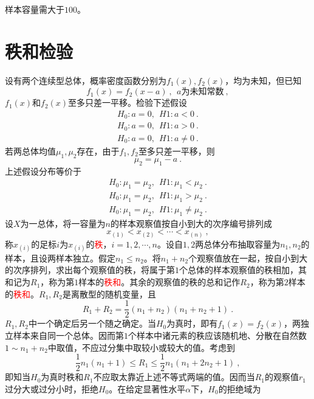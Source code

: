 \documentclass[12pt,a4paper]{article}
\begin{document}
样本容量需大于$100$。


\section{秩和检验}
设有两个连续型总体，概率密度函数分别为$f_1(x), f_2(x)$，均为未知，但已知
\begin{equation}
f_1(x) = f_2(x-a) ~, ~~a\text{为未知常数} ~, 
\end{equation}
$f_1(x)$和$f_2(x)$至多只差一平移。检验下述假设
\begin{eqnarray}
H_0 : a = 0, ~~H1 : a < 0 ~. \\
H_0 : a = 0, ~~H1 : a > 0 ~. \\
H_0 : a = 0, ~~H1 : a \neq 0 ~.
\end{eqnarray}
若两总体均值$\mu_1, \mu_2$存在，由于$f_1, f_2$至多只差一平移，则
\begin{equation*}
\mu_2 = \mu_1 - a ~.
\end{equation*}
上述假设分布等价于
\begin{eqnarray}
H_0 : \mu_1 = \mu_2, ~~H1 : \mu_1 < \mu_2 ~. \\
H_0 : \mu_1 = \mu_2, ~~H1 : \mu_1 > \mu_2 ~. \\
H_0 : \mu_1 = \mu_2, ~~H1 : \mu_1 \neq \mu_2 ~.
\end{eqnarray}
设$X$为一总体，将一容量为$n$的样本观察值按自小到大的次序编号排列成
\begin{equation}
x_{(1)} < x_{(2)} < \cdots < x_{(n)} ~, 
\end{equation}
称$x_{(i)}$的足标$i$为$x_{(i)}$的\textcolor{red}{秩}，$i = 1, 2, \cdots, n$。设自$1,2$两总体分布抽取容量为$n_1, n_2$的样本，且设两样本独立。假定$n_1\leqslant n_2$。将$n_1+ n_2$个观察值放在一起，按自小到大的次序排列，求出每个观察值的秩，将属于第$1$个总体的样本观察值的秩相加，其和记为$R_1$，称为第$1$样本的\textcolor{red}{秩和}。其余的观察值的秩的总和记作$R_2$，称为第$2$样本的\textcolor{red}{秩和}。$R_1, R_2$是离散型的随机变量，且
\begin{equation}
R_1+ R_2 = \frac{1}{2}(n_1 +n_2) (n_1 +n_2+1) ~.
\end{equation}
$R_1, R_2$中一个确定后另一个随之确定。当$H_0$为真时，即有$f_1(x) = f_2(x)$，两独立样本来自同一个总体。因而第$1$个样本中诸元素的秩应该随机地、分散在自然数$1\sim n_1 +n_2$中取值，不应过分集中取较小或较大的值。考虑到
\begin{equation*}
\frac{1}{2}n_1 (n_1+1) \leqslant R_1 \leqslant \frac{1}{2}n_1 (n_1 +2n_2+1) ~,
\end{equation*}
即知当$H_0$为真时秩和$R_1$不应取太靠近上述不等式两端的值。因而当$R_1$的观察值$r_1$过分大或过分小时，拒绝$H_0$。在给定显著性水平$\alpha$下，$H_0$的拒绝域为
\end{document}
